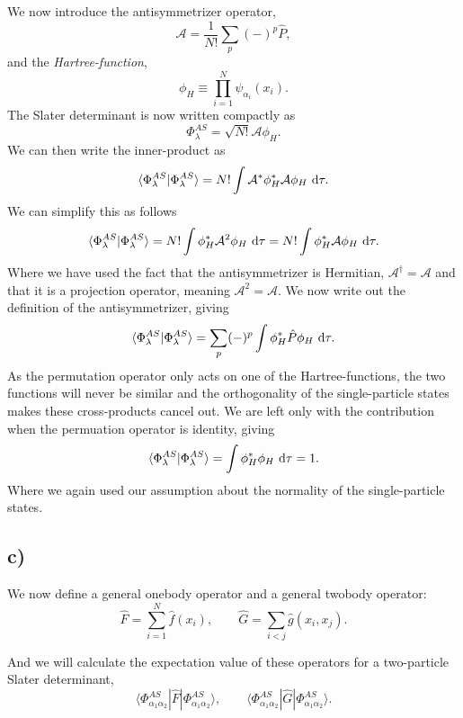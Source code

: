 \documentclass[a4paper, 11pt, notitlepage, english]{article}
\newcommand{\braket}[2]{\langle #1 | #2 \rangle}
\newcommand{\op}[1]{\hat{#1}}
\newcommand{\braopket}[3]{\langle #1 | {#2} | #3 \rangle}
\renewcommand{\d}{{\rm d}}
\begin{document}
We now introduce the antisymmetrizer operator,
$$\mathcal{A} = \frac{1}{N!}\sum_p (-)^p \op{P},$$
and the \emph{Hartree-function},
$$\phi_H \equiv \prod_{i=1}^N \psi_{\alpha_i}(x_i).$$
The Slater determinant is now written compactly as
$$\Phi_\lambda^{AS} = \sqrt{N!}\mathcal{A}\phi_H.$$
We can then write the inner-product as
$$\braket{\Phi_\lambda^{AS}}{\Phi_\lambda^{AS}} = N! \int \mathcal{A}^* \phi^*_H \mathcal{A} \phi_H \ \d \tau .$$
We can simplify this as follows
$$\braket{\Phi_\lambda^{AS}}{\Phi_\lambda^{AS}} = N! \int \phi^*_H \mathcal{A}^2 \phi_H \ \d \tau = N! \int \phi^*_H \mathcal{A} \phi_H \ \d \tau.$$
Where we have used the fact that the antisymmetrizer is Hermitian, $\mathcal{A}^\dagger = \mathcal{A}$ and that it is a projection operator, meaning $\mathcal{A}^2 = \mathcal{A}$.
We now write out the definition of the antisymmetrizer, giving
$$\braket{\Phi_\lambda^{AS}}{\Phi_\lambda^{AS}} = \sum_p (-)^p \int \phi^*_H \\\op{P} \phi_H \ \d \tau.$$
As the permutation operator only acts on one of the Hartree-functions, the two functions will never be similar and the orthogonality of the single-particle states makes these cross-products cancel out. We are left only with the contribution when the permuation operator is identity, giving
$$\braket{\Phi_\lambda^{AS}}{\Phi_\lambda^{AS}} = \int \phi^*_H \phi_H \ \d \tau = 1.$$
Where we again used our assumption about the normality of the single-particle states.

\clearpage

\subsection*{c)}
We now define a general onebody operator and a general twobody operator:
$$\op{F} = \sum_{i=1}^N \op{f}(x_i), \qquad \op{G} = \sum_{i<j} \op{g}(x_i, x_j).$$

And we will  calculate the expectation value of these operators for a two-particle Slater determinant, 
$$\braopket{\Phi^{AS}_{\alpha_1\alpha_2}}{\op{F}}{\Phi^{AS}_{\alpha_1\alpha_2}}, \qquad \braopket{\Phi^{AS}_{\alpha_1\alpha_2}}{\op{G}}{\Phi^{AS}_{\alpha_1\alpha_2}}.$$
\end{document}
